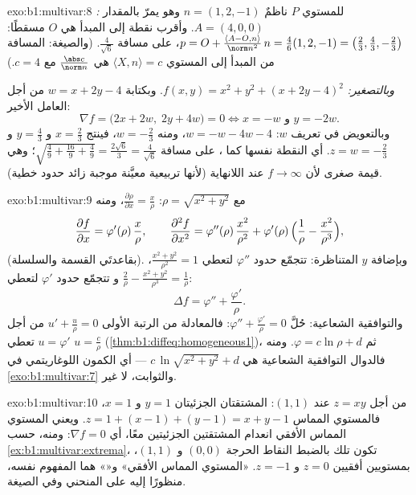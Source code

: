 \begin{solution}{exo:b1:multivar:8}
\emph{:} للمستوي $P$ ناظمٌ $n = (1, 2, -1)$ وهو
يمرّ بالمقدار $A = (4, 0, 0)$. وأقرب نقطة إلى المبدأ هي
$O$ مسقطًا: $p = O + \frac{\langle A - O, n\rangle}{\norm
n^2}\,n = \frac{4}{6}(1,2,-1) = \bigl(\frac23, \frac43,
-\frac23\bigr)$، على مسافة $\frac{4}{\sqrt 6}$. (والصيغة: المسافة
من المبدأ إلى المستوي $\langle X, n \rangle = c$ هي
$\frac{\abs c}{\norm n}$ مع $c = 4$.)

\emph{وبالتصغير:} $f(x,y) = x^2 + y^2 + (x + 2y - 4)^2$. وبكتابة
$w = x + 2y - 4$ من أجل العامل الأخير:
\[
\nabla f = \bigl(2x + 2w,\; 2y + 4w\bigr) = 0
\iff x = -w \text{ و } y = -2w .
\]
وبالتعويض في تعريف $w$: $w = -w - 4w - 4$، ومنه $w =
-\frac23$، فينتج $x = \frac23$ و $y = \frac43$ و $z = w =
-\frac23$. أي النقطة نفسها كما ، على مسافة
$\sqrt{\frac49 + \frac{16}{9} + \frac49} = \frac{2\sqrt 6}{3} =
\frac{4}{\sqrt6}$؛ وهي قيمة صغرى لأن $f \to \infty$ عند اللانهاية
(لأنها تربيعية معيَّنة موجبة زائد حدود خطية).
\end{solution}

\begin{solution}{exo:b1:multivar:9}
مع $\rho = \sqrt{x^2+y^2}$: $\frac{\partial \rho}{\partial x} =
\frac{x}{\rho}$، ومنه
\[
\frac{\partial f}{\partial x} = \varphi'(\rho)\,\frac{x}{\rho},
\qquad
\frac{\partial^2 f}{\partial x^2}
= \varphi''(\rho)\,\frac{x^2}{\rho^2}
+ \varphi'(\rho)\,\Bigl(\frac{1}{\rho} -
\frac{x^2}{\rho^3}\Bigr),
\]
(بقاعدتَي القسمة والسلسلة). وبإضافة  $y$ المتناظرة:
تتجمّع حدود $\varphi''$ لتعطي $\frac{x^2 + y^2}{\rho^2} = 1$، و
تتجمّع حدود $\varphi'$ لتعطي $\frac{2}{\rho} - \frac{x^2 +
y^2}{\rho^3} = \frac{1}{\rho}$:
\[
\Delta f = \varphi'' + \frac{\varphi'}{\rho} .
\]
والتوافقية الشعاعية: حُلَّ $\varphi'' + \frac{\varphi'}{\rho} = 0$:
فالمعادلة من الرتبة الأولى $u' + \frac u\rho = 0$ من أجل $u = \varphi'$
تعطي $u = \frac{c}{\rho}$ (\cref{thm:b1:diffeq:homogeneous1})،
ثم $\varphi = c\ln\rho + d$. ومنه فالدوال التوافقية الشعاعية هي
$c\,\ln\sqrt{x^2 + y^2} + d$ --- أي الكمون اللوغاريتمي في
\cref{exo:b1:multivar:7} والثوابت، لا غير.
\end{solution}

\begin{solution}{exo:b1:multivar:10}
من أجل $z = xy$ عند $(1,1)$: المشتقتان الجزئيتان $y = 1$ و $x = 1$، فالمستوي
المماس $z = 1 + (x - 1) + (y - 1) = x + y - 1$. ويعني المستوي المماس
الأفقي انعدام المشتقتين الجزئيتين معًا، أي $\nabla f = 0$:
ومنه، حسب \cref{ex:b1:multivar:extrema}، تكون تلك بالضبط النقاط الحرجة
$(0, 0)$ و $(1, 1)$، بمستويين أفقيين $z = 0$ و $z =
-1$.  «المستوي المماس الأفقي» و«» هما
المفهوم نفسه، منظورًا إليه على المنحني وفي الصيغة.
\end{solution}

